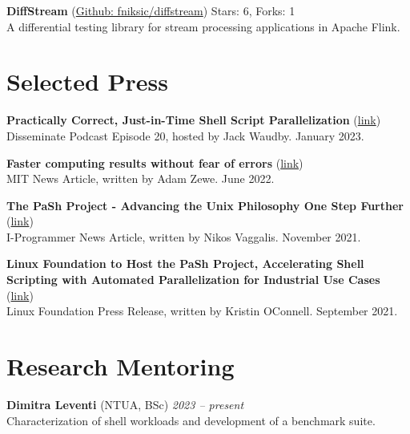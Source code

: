 \documentclass[margin]{res}
\begin{document}
\begin{resume}
\textbf{DiffStream} (\href{https://github.com/fniksic/diffstream}{Github: fniksic/diffstream}) Stars: 6, Forks: 1 \\
A differential testing library for stream processing applications in Apache Flink.

\section{Selected Press}

\textbf{Practically Correct, Just-in-Time Shell Script Parallelization} (\href{https://disseminatepodcast.podcastpage.io/episode/konstantinos-kallas-practically-correct-just-in-time-shell-script-parallelization-20}{link}) \\
Disseminate Podcast Episode 20, hosted by Jack Waudby. January 2023.

\textbf{Faster computing results without fear of errors} (\href{https://news.mit.edu/2022/faster-unix-computing-program-0607}{link}) \\
MIT News Article, written by Adam Zewe. June 2022.

\textbf{The PaSh Project - Advancing the Unix Philosophy One Step Further} (\href{https://www.i-programmer.info/news/90-tools/14990-the-pash-project-advancing-the-unix-philosophy-one-step-further.html}{link}) \\
I-Programmer News Article, written by Nikos Vaggalis. November 2021.

\textbf{Linux Foundation to Host the PaSh Project, Accelerating Shell Scripting with Automated Parallelization for Industrial Use Cases} (\href{https://www.linuxfoundation.org/press/press-release/linux-foundation-to-host-the-pash-project-accelerating-shell-scripting-with-automated-parallelization-for-industrial-use-cases}{link}) \\
Linux Foundation Press Release, written by Kristin OConnell. September 2021.




\section{Research Mentoring}

\textbf{Dimitra Leventi} (NTUA, BSc) \hfill {\em 2023 -- present} \\
Characterization of shell workloads and development of a benchmark suite.


\end{resume}
\end{document}
